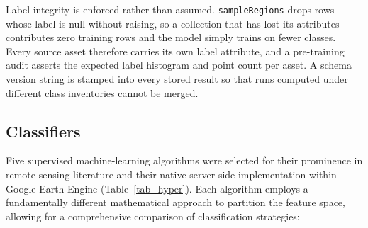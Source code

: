 \documentclass[conference]{IEEEtran}
\begin{document}
Label integrity is enforced rather than assumed. \texttt{sampleRegions} drops rows whose label is null without raising, so a collection that has lost its attributes contributes zero training rows and the model simply trains on fewer classes. Every source asset therefore carries its own label attribute, and a pre-training audit asserts the expected label histogram and point count per asset. A schema version string is stamped into every stored result so that runs computed under different class inventories cannot be merged.

\subsection{Classifiers}
Five supervised machine-learning algorithms were selected for their prominence in remote sensing literature and their native server-side implementation within Google Earth Engine (Table~\ref{tab_hyper}). Each algorithm employs a fundamentally different mathematical approach to partition the feature space, allowing for a comprehensive comparison of classification strategies:
\end{document}
